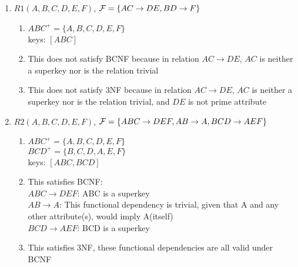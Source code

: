 \documentclass[11pt]{article}
\begin{document}
\begin{enumerate}

\item $R1(A,B,C,D,E,F)$, ${\cal F} = \{AC\rightarrow DE, BD\rightarrow F \}$
    \begin{enumerate}[label=\Alph*]
    \item $ABC^+ = \{A,B,C,D,E,F\}$ \\
    keys: $[ABC]$
    \item This does not satisfy BCNF because in relation $AC \rightarrow DE$, $AC$ is neither a superkey nor is the relation trivial
    \item This does not satisfy 3NF because in relation $AC \rightarrow DE$, $AC$ is neither a superkey nor is the relation trivial, and $DE$ is not prime attribute 
    \end{enumerate}
\item $R2(A,B,C,D,E,F)$, ${\cal F} = \{ABC\rightarrow DEF,
  AB\rightarrow A, BCD\rightarrow AEF \}$
    \begin{enumerate}[label=\Alph*]
    \item $ABC^+ = \{A,B,C,D,E,F\}$ \\
    $BCD^+ = \{B,C,D,A,E,F\}$ \\
    keys: $[ABC, BCD]$
    \item This satisfies BCNF:\\
    $ABC \rightarrow DEF$: ABC is a superkey \\
    $AB \rightarrow A$: This functional dependency is trivial, given that A and any other attribute(s), would imply A(itself) \\
    $BCD \rightarrow AEF$: BCD is a superkey
    \item This satisfies 3NF, these functional dependencies are all valid under BCNF
    \end{enumerate}


\end{enumerate}
\end{document}
